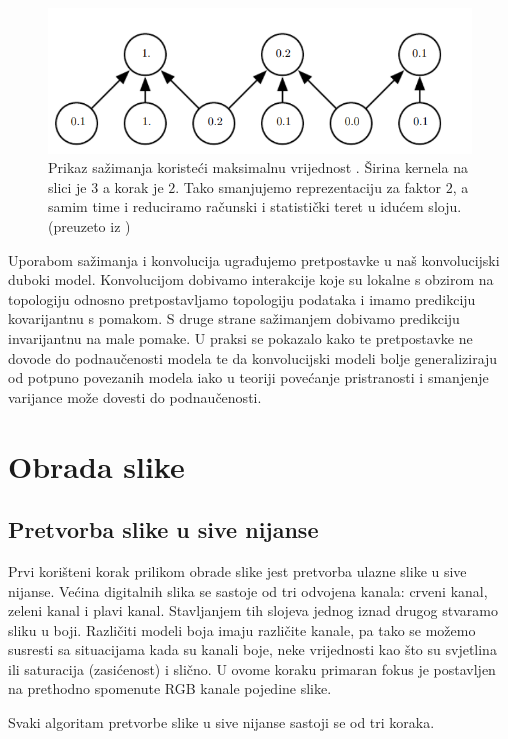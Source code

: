 \documentclass[times, utf8, diplomski]{fer}
\theoremstyle{definition}
\begin{document}
\begin{figure}[h]
\centering
\includegraphics[scale=0.5]{pooling.png}
\caption{Prikaz sažimanja koristeći maksimalnu vrijednost . Širina kernela na slici je $3$ a korak je $2$. Tako smanjujemo reprezentaciju za faktor $2$, a samim time i reduciramo računski i statistički teret u idućem sloju. \\ (preuzeto iz \cite{Goodfellow-et-al-2016})}
\label{konvolucija}
\end{figure}

Uporabom sažimanja i konvolucija ugrađujemo pretpostavke u naš konvolucijski duboki model. Konvolucijom dobivamo interakcije koje su lokalne s obzirom na topologiju odnosno pretpostavljamo topologiju podataka i imamo predikciju kovarijantnu s pomakom. S druge strane sažimanjem dobivamo predikciju invarijantnu na male pomake. U praksi se pokazalo kako te pretpostavke ne dovode do podnaučenosti modela te da konvolucijski modeli bolje generaliziraju od potpuno povezanih modela iako u teoriji povećanje pristranosti i smanjenje varijance može dovesti do podnaučenosti.

\chapter{Obrada slike}
\section{Pretvorba slike u sive nijanse}
Prvi korišteni korak prilikom obrade slike jest pretvorba ulazne slike u sive nijanse. Većina digitalnih slika se sastoje od tri odvojena kanala: crveni kanal, zeleni kanal i plavi kanal. Stavljanjem tih slojeva jednog iznad drugog stvaramo sliku u boji. Različiti modeli boja imaju različite kanale, pa tako se možemo susresti sa situacijama kada su kanali boje, neke vrijednosti kao što su svjetlina ili saturacija (zasićenost) i slično. U ovome koraku primaran fokus je postavljen na prethodno spomenute RGB kanale pojedine slike.

Svaki algoritam pretvorbe slike u sive nijanse sastoji se od tri koraka.
\end{document}
